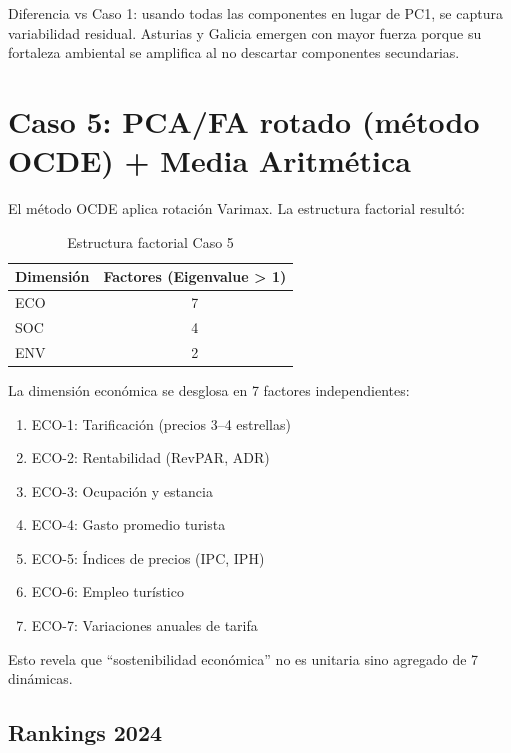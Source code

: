 Diferencia vs Caso 1: usando todas las componentes en lugar de PC1, se captura variabilidad residual. Asturias y Galicia emergen con mayor fuerza porque su fortaleza ambiental se amplifica al no descartar componentes secundarias.

\section{Caso 5: PCA/FA rotado (método OCDE) + Media Aritmética}

El método OCDE aplica rotación Varimax. La estructura factorial resultó:

\begin{table}[H]
    \centering
    \begin{tabular}{lc}
        \toprule
        \textbf{Dimensión} & \textbf{Factores (Eigenvalue > 1)} \\
        \midrule
        ECO & 7 \\
        SOC & 4 \\
        ENV & 2 \\
        \bottomrule
    \end{tabular}
    \caption{Estructura factorial Caso 5}
\end{table}

La dimensión económica se desglosa en 7 factores independientes:
\begin{enumerate}
    \item ECO-1: Tarificación (precios 3--4 estrellas)
    \item ECO-2: Rentabilidad (RevPAR, ADR)
    \item ECO-3: Ocupación y estancia
    \item ECO-4: Gasto promedio turista
    \item ECO-5: Índices de precios (IPC, IPH)
    \item ECO-6: Empleo turístico
    \item ECO-7: Variaciones anuales de tarifa
\end{enumerate}

Esto revela que ``sostenibilidad económica'' no es unitaria sino agregado de 7 dinámicas.

\subsection{Rankings 2024}


